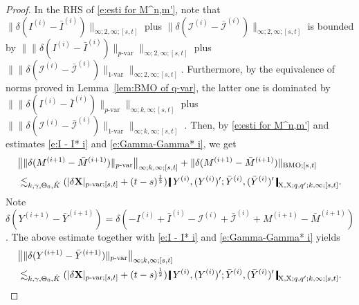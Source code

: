 \documentclass[11pt,reqno]{amsart}
\numberwithin{equation}{section}
\newcommand{\shortthickbar}{%
  \vcenter{\hbox{\rule{1.8pt}{2.2ex}}}%
}
\newcommand{\thicknm}[1]{%
  \mathopen{\shortthickbar}%
  \mkern4mu #1 \mkern4mu%
  \mathclose{\shortthickbar}%
}
\begin{document}
\begin{proof}
In the RHS of \eqref{e:esti for M^n,m'}, note that $\| \delta (I^{(i)} - \bar I^{(i)}) \|_{\infty;2,\infty;[s,t]} $ plus $ \| \delta (\mathcal I^{(i)} - \bar{\mathcal I}^{(i)}) \|_{\infty;2,\infty;[s,t]}$ is bounded by $\| \| \delta (I^{(i)} - \bar I^{(i)}) \|_{p\text{-}\mathrm{var}} \|_{\infty;2,\infty;[s,t]}  $ plus $\| \| \delta (\mathcal I^{(i)} - \bar{\mathcal I}^{(i)}) \|_{1\text{-}\mathrm{var}} \|_{\infty;2,\infty;[s,t]}$. Furthermore, by the equivalence of norms proved in Lemma~\ref{lem:BMO of q-var}, the latter one is dominated by $\| \| \delta (I^{(i)} - \bar I^{(i)}) \|_{p\text{-}\mathrm{var}} \|_{\infty;k,\infty;[s,t]}  $ plus $\| \| \delta (\mathcal I^{(i)} - \bar{\mathcal I}^{(i)}) \|_{1\text{-}\mathrm{var}} \|_{\infty;k,\infty;[s,t]}$ .
Then, by \eqref{e:esti for M^n,m'} and estimates \eqref{e:I - I* i} and \eqref{e:Gamma-Gamma* i}, we get 
\begin{equation}\label{e:M i - M i-1}
\begin{aligned}
& \big\| \|\delta (M^{(i+1)} - \bar M^{(i+1)})\|_{p\text{-}\mathrm{var}} \big\|_{\infty;k,\infty;[s,t]} + \|\delta (M^{(i+1)} - \bar M^{(i+1)})\|_{\mathrm{BMO};[s,t]} \\
&\lesssim_{k,\gamma,\Theta_0,\hat K} (|\delta \mathbf X|_{p\text{-}\mathrm{var};[s,t]} + (t-s)^{\frac{1}{2}}) \, \thicknm{Y^{(i)},(Y^{(i)})';  \bar Y^{(i)},(\bar Y^{(i)})'}_{\mathrm X,\mathrm X;q,q';k,\infty;[s,t]}. 
\end{aligned}
\end{equation}
 Note $\delta (Y^{(i+1)} - \bar Y^{(i+1)}) = \delta (- I^{(i)} + \bar I^{(i)} - \mathcal I^{(i)} + \bar{\mathcal I}^{(i)} + M^{(i+1)} - \bar M^{(i+1)})$. The above estimate together with \eqref{e:I - I* i} and \eqref{e:Gamma-Gamma* i} yields 
\begin{equation}\label{e:Y i - Y i-1}
\begin{aligned}
&\big\| \|\delta (Y^{(i+1)} - \bar Y^{(i+1)})\|_{p\text{-}\mathrm{var}} \big\|_{\infty;k,\infty;[s,t]} \\
&\lesssim_{k,\gamma,\Theta_0,\hat K} (|\delta \mathbf X|_{p\text{-}\mathrm{var};[s,t]} + (t-s)^{\frac{1}{2}}) \, \thicknm{Y^{(i)},(Y^{(i)})';  \bar Y^{(i)},(\bar Y^{(i)})'}_{\mathrm X,\mathrm X;q,q';k,\infty;[s,t]}. 
\end{aligned}
\end{equation}


\end{proof}
\end{document}
